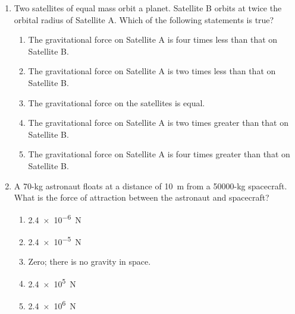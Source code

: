 \documentclass{../../oss-apphys}
\begin{document}
\begin{multicols}{2}
\begin{enumerate}[leftmargin=18pt,start=8]
%
  
  \item Two satellites of equal mass orbit a planet. Satellite B orbits at twice
    the orbital radius of Satellite A. Which of the following statements is
    true?
    \begin{enumerate}[noitemsep,topsep=0pt,leftmargin=18pt]
    \item The gravitational force on Satellite A is four times less than that on
      Satellite B.
    \item The gravitational force on Satellite A is two times less than that on
      Satellite B.
    \item The gravitational force on the satellites is equal.
    \item The gravitational force on Satellite A is two times greater than that
      on Satellite B.
    \item The gravitational force on Satellite A is four times greater than that
      on Satellite B.
    \end{enumerate}

    \columnbreak
    
  \item A 70-\si{kg} astronaut floats at a distance of \SI{10}{\m} from a
    50000-\si{\kg} spacecraft. What is the force of attraction between the
    astronaut and spacecraft?
    \begin{enumerate}[noitemsep,topsep=0pt,leftmargin=18pt]
    \item\SI{2.4e-6}{N}
    \item\SI{2.4e-5}{N}
    \item Zero; there is no gravity in space.
    \item\SI{2.4e5}{N}
    \item\SI{2.4e6}{N}
    \end{enumerate}
    

\end{enumerate}
\end{multicols}
\end{document}

